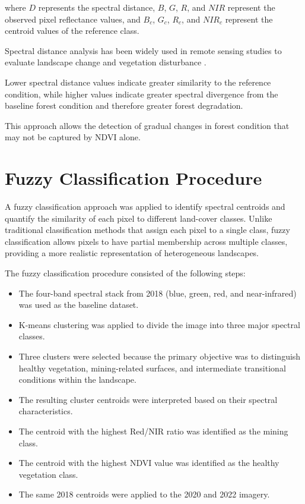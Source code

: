 \documentclass[a4paper,12pt]{report}
\begin{document}
where $D$ represents the spectral distance, $B$, $G$, $R$, and $NIR$ represent the observed pixel reflectance values, and $B_c$, $G_c$, $R_c$, and $NIR_c$ represent the centroid values of the reference class.

Spectral distance analysis has been widely used in remote sensing studies to evaluate landscape change and vegetation disturbance \citep{richards2013remote}.

Lower spectral distance values indicate greater similarity to the reference condition, while higher values indicate greater spectral divergence from the baseline forest condition and therefore greater forest degradation.

This approach allows the detection of gradual changes in forest condition that may not be captured by NDVI alone.


\section{Fuzzy Classification Procedure}

A fuzzy classification approach was applied to identify spectral centroids and quantify the similarity of each pixel to different land-cover classes. Unlike traditional classification methods that assign each pixel to a single class, fuzzy classification allows pixels to have partial membership across multiple classes, providing a more realistic representation of heterogeneous landscapes.

The fuzzy classification procedure consisted of the following steps:

\begin{itemize}
\item The four-band spectral stack from 2018 (blue, green, red, and near-infrared) was used as the baseline dataset.
\item K-means clustering was applied to divide the image into three major spectral classes.
\item Three clusters were selected because the primary objective was to distinguish healthy vegetation, mining-related surfaces, and intermediate transitional conditions within the landscape.
\item The resulting cluster centroids were interpreted based on their spectral characteristics.
\item The centroid with the highest Red/NIR ratio was identified as the mining class.
\item The centroid with the highest NDVI value was identified as the healthy vegetation class.
\item The same 2018 centroids were applied to the 2020 and 2022 imagery.
\end{itemize}
\end{document}
